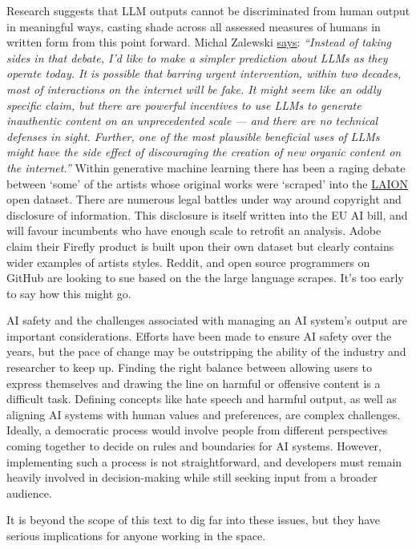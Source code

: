 Research suggests that LLM outputs cannot be discriminated from human output in meaningful ways, casting shade across all assessed measures of humans in written form \cite{sadasivan2023can} from this point forward. Michal Zalewski \href{https://lcamtuf.substack.com/p/llms-a-bleak-future-ahead}{says}: \textit{``Instead of taking sides in that debate, I’d like to make a simpler prediction about LLMs as they operate today. It is possible that barring urgent intervention, within two decades, most of interactions on the internet will be fake. It might seem like an oddly specific claim, but there are powerful incentives to use LLMs to generate inauthentic content on an unprecedented scale — and there are no technical defenses in sight. Further, one of the most plausible beneficial uses of LLMs might have the side effect of discouraging the creation of new organic content on the internet.''}
Within generative machine learning there has been a raging debate between `some' of the artists whose original works were `scraped' into the \href{https://laion.ai/}{LAION} open dataset. There are numerous legal battles under way around copyright and disclosure of information. This disclosure is itself written into the EU AI bill, and will favour incumbents who have enough scale to retrofit an analysis. Adobe claim their Firefly product is built upon their own dataset but clearly contains wider examples of artists styles. Reddit, and open source programmers on GitHub are looking to sue based on the the large language scrapes. It's too early to say how this might go.\par
AI safety and the challenges associated with managing an AI system's output are important considerations. Efforts have been made to ensure AI safety over the years, but the pace of change may be outstripping the ability of the industry and researcher to keep up. Finding the right balance between allowing users to express themselves and drawing the line on harmful or offensive content is a difficult task. Defining concepts like hate speech and harmful output, as well as aligning AI systems with human values and preferences, are complex challenges. Ideally, a democratic process would involve people from different perspectives coming together to decide on rules and boundaries for AI systems. However, implementing such a process is not straightforward, and developers must remain heavily involved in decision-making while still seeking input from a broader audience.\par
It is beyond the scope of this text to dig far into these issues, but they have serious implications for anyone working in the space. \par 
